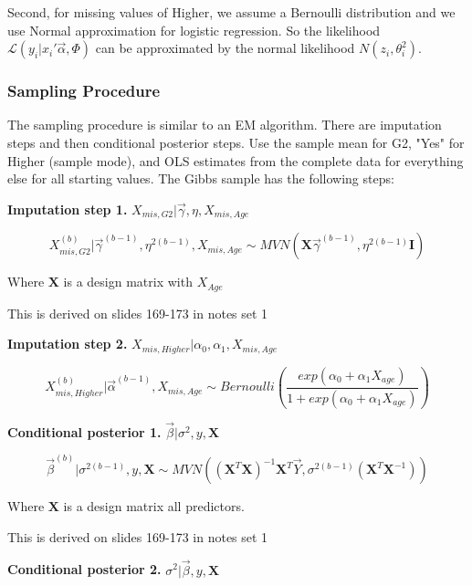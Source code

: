\documentclass[11pt]{article}
\begin{document}
\vspace{0.25in}

Second, for missing values of Higher, we assume a Bernoulli distribution and we use Normal approximation for logistic regression. So the likelihood $\mathcal{L}(y_i|x_i'\vec\alpha, \Phi)$ can be approximated by the normal likelihood $N(z_i, \theta^2_i)$.

\subsubsection{Sampling Procedure}

The sampling procedure is similar to an EM algorithm. There are imputation steps and then conditional posterior steps. Use the sample mean for G2, "Yes" for Higher (sample mode), and OLS estimates from the complete data for everything else for all starting values. The Gibbs sample has the following steps:

\vspace{0.25in}

\textbf{Imputation step 1.} $X_{mis, G2}|\vec\gamma, \eta, X_{mis, Age}$

$$X_{mis, G2}^{(b)}|\vec\gamma^{(b - 1)}, \eta^{2(b - 1)}, X_{mis, Age} \sim MVN(\mathbf{X}\vec{\gamma}^{(b - 1)}, \eta^{2(b - 1)}\mathbf{I})$$

Where $\mathbf{X}$ is a design matrix with $X_{Age}$

This is derived on slides 169-173 in notes set 1

\vspace{0.25in}

\textbf{Imputation step 2.} $X_{mis, Higher}|\alpha_0, \alpha_1, X_{mis, Age}$

$$X_{mis, Higher}^{(b)}|\vec\alpha^{(b - 1)}, X_{mis, Age} \sim Bernoulli\left(\frac{exp(\alpha_0 + \alpha_1X_{age})}{1 + exp(\alpha_0 + \alpha_1X_{age})}\right)$$

\textbf{Conditional posterior 1.} $\vec\beta | \sigma^2, y, \mathbf{X}$

$$\vec\beta^{(b)} | \sigma^{2(b - 1)}, y, \mathbf{X} \sim MVN((\mathbf{X}^T\mathbf{X})^{-1}\mathbf{X}^T\vec{Y}, \sigma^{2(b - 1)}(\mathbf{X}^T\mathbf{X}^{-1}))$$

Where $\mathbf{X}$ is a design matrix all predictors.

This is derived on slides 169-173 in notes set 1

\vspace{0.25in}

\textbf{Conditional posterior 2.} $\sigma^2 | \vec\beta, y, \mathbf{X}$
\end{document}
